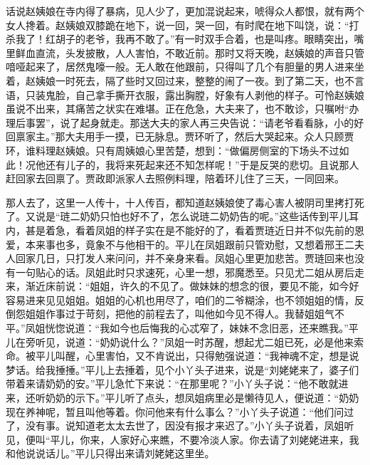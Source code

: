 


\begin{parag}
    话说赵姨娘在寺内得了暴病，见人少了，更加混说起来，唬得众人都恨，就有两个女人搀着。赵姨娘双膝跪在地下，说一回，哭一回，有时爬在地下叫饶，说：“打杀我了！红胡子的老爷，我再不敢了。”有一时双手合着，也是叫疼。眼睛突出，嘴里鲜血直流，头发披散，人人害怕，不敢近前。那时又将天晚，赵姨娘的声音只管喑哑起来了，居然鬼嚎一般。无人敢在他跟前，只得叫了几个有胆量的男人进来坐着，赵姨娘一时死去，隔了些时又回过来，整整的闹了一夜。到了第二天，也不言语，只装鬼脸，自己拿手撕开衣服，露出胸膛，好象有人剥他的样子。可怜赵姨娘虽说不出来，其痛苦之状实在难堪。正在危急，大夫来了，也不敢诊，只嘱咐“办理后事罢”，说了起身就走。那送大夫的家人再三央告说：“请老爷看看脉，小的好回禀家主。”那大夫用手一摸，已无脉息。贾环听了，然后大哭起来。众人只顾贾环，谁料理赵姨娘。只有周姨娘心里苦楚，想到：“做偏房侧室的下场头不过如此！况他还有儿子的，我将来死起来还不知怎样呢！”于是反哭的悲切。且说那人赶回家去回禀了。贾政即派家人去照例料理，陪着环儿住了三天，一同回来。
\end{parag}


\begin{parag}
    那人去了，这里一人传十，十人传百，都知道赵姨娘使了毒心害人被阴司里拷打死了。又说是“琏二奶奶只怕也好不了，怎么说琏二奶奶告的呢。”这些话传到平儿耳内，甚是着急，看着凤姐的样子实在是不能好的了，看着贾琏近日并不似先前的恩爱，本来事也多，竟象不与他相干的。平儿在凤姐跟前只管劝慰，又想着邢王二夫人回家几日，只打发人来问问，并不亲身来看。凤姐心里更加悲苦。贾琏回来也没有一句贴心的话。凤姐此时只求速死，心里一想，邪魔悉至。只见尤二姐从房后走来，渐近床前说：“姐姐，许久的不见了。做妹妹的想念的很，要见不能，如今好容易进来见见姐姐。姐姐的心机也用尽了，咱们的二爷糊涂，也不领姐姐的情，反倒怨姐姐作事过于苛刻，把他的前程去了，叫他如今见不得人。我替姐姐气不平。”凤姐恍惚说道：“我如今也后悔我的心忒窄了，妹妹不念旧恶，还来瞧我。”平儿在旁听见，说道：“奶奶说什么？”凤姐一时苏醒，想起尤二姐已死，必是他来索命。被平儿叫醒，心里害怕，又不肯说出，只得勉强说道：“我神魂不定，想是说梦话。给我捶捶。”平儿上去捶着，见个小丫头子进来，说是“刘姥姥来了，婆子们带着来请奶奶的安。”平儿急忙下来说：“在那里呢？”小丫头子说：“他不敢就进来，还听奶奶的示下。”平儿听了点头，想凤姐病里必是懒待见人，便说道：“奶奶现在养神呢，暂且叫他等着。你问他来有什么事么？”小丫头子说道：“他们问过了，没有事。说知道老太太去世了，因没有报才来迟了。”小丫头子说着，凤姐听见，便叫“平儿，你来，人家好心来瞧，不要冷淡人家。你去请了刘姥姥进来，我和他说说话儿。”平儿只得出来请刘姥姥这里坐。
\end{parag}



